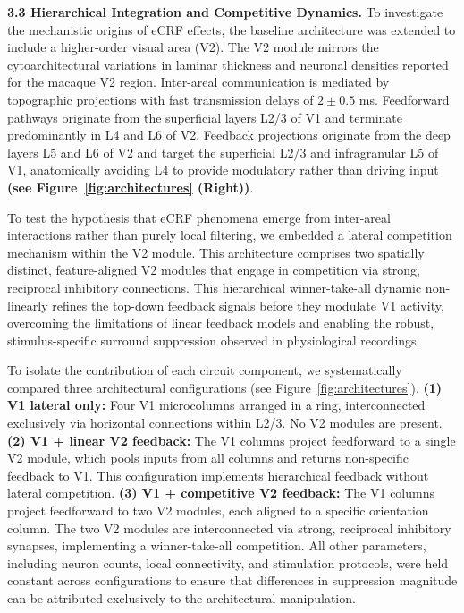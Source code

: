 \textbf{3.3 Hierarchical Integration and Competitive Dynamics.} To investigate the mechanistic origins of eCRF effects, the baseline architecture was extended to include a higher-order visual area (V2). The V2 module mirrors the cytoarchitectural variations in laminar thickness and neuronal densities reported for the macaque V2 region. Inter-areal communication is mediated by topographic projections with fast transmission delays of $2 \pm 0.5$ ms. Feedforward pathways originate from the superficial layers L2/3 of V1 and terminate predominantly in L4 and L6 of V2. Feedback projections originate from the deep layers L5 and L6 of V2 and target the superficial L2/3 and infragranular L5 of V1, anatomically avoiding L4 to provide modulatory rather than driving input \textbf{(see Figure~\ref{fig:architectures} (Right))}.

To test the hypothesis that eCRF phenomena emerge from inter-areal interactions rather than purely local filtering, we embedded a lateral competition mechanism within the V2 module. This architecture comprises two spatially distinct, feature-aligned V2 modules that engage in competition via strong, reciprocal inhibitory connections. This hierarchical winner-take-all dynamic non-linearly refines the top-down feedback signals before they modulate V1 activity, overcoming the limitations of linear feedback models and enabling the robust, stimulus-specific surround suppression observed in physiological recordings.

%
To isolate the contribution of each circuit component, we systematically compared three architectural configurations (see Figure~\ref{fig:architectures}). \textbf{(1) V1 lateral only:} Four V1 microcolumns arranged in a ring, interconnected exclusively via horizontal connections within L2/3. No V2 modules are present. \textbf{(2) V1 + linear V2 feedback:} The V1 columns project feedforward to a single V2 module, which pools inputs from all columns and returns non-specific feedback to V1. This configuration implements hierarchical feedback without lateral competition. \textbf{(3) V1 + competitive V2 feedback:} The V1 columns project feedforward to two V2 modules, each aligned to a specific orientation column. The two V2 modules are interconnected via strong, reciprocal inhibitory synapses, implementing a winner-take-all competition. All other parameters, including neuron counts, local connectivity, and stimulation protocols, were held constant across configurations to ensure that differences in suppression magnitude can be attributed exclusively to the architectural manipulation.

